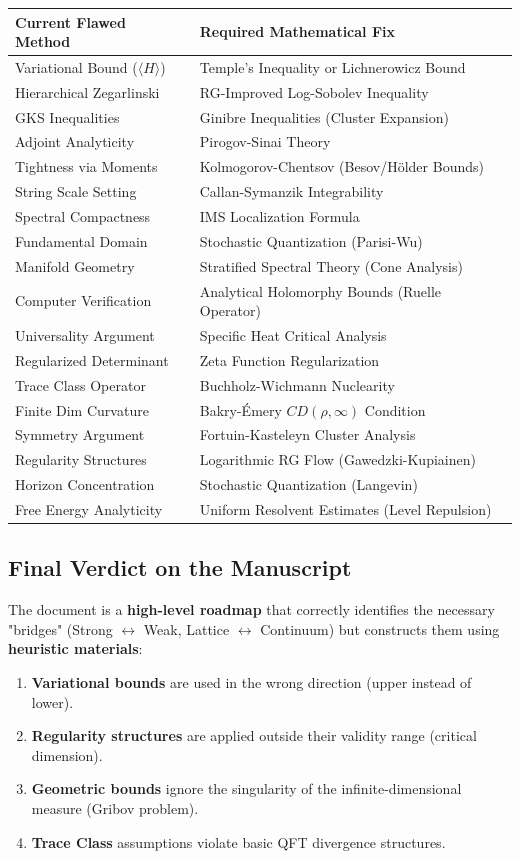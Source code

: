 \begin{center}
\begin{tabular}{|l|l|}
\hline
\textbf{Current Flawed Method} & \textbf{Required Mathematical Fix} \\
\hline
Variational Bound ($\langle H \rangle$) & Temple's Inequality or Lichnerowicz Bound \\
Hierarchical Zegarlinski & RG-Improved Log-Sobolev Inequality \\
GKS Inequalities & Ginibre Inequalities (Cluster Expansion) \\
Adjoint Analyticity & Pirogov-Sinai Theory \\
Tightness via Moments & Kolmogorov-Chentsov (Besov/Hölder Bounds) \\
String Scale Setting & Callan-Symanzik Integrability \\
Spectral Compactness & IMS Localization Formula \\
Fundamental Domain & Stochastic Quantization (Parisi-Wu) \\
Manifold Geometry & Stratified Spectral Theory (Cone Analysis) \\
Computer Verification & Analytical Holomorphy Bounds (Ruelle Operator) \\
Universality Argument & Specific Heat Critical Analysis \\
Regularized Determinant & Zeta Function Regularization \\
Trace Class Operator & Buchholz-Wichmann Nuclearity \\
Finite Dim Curvature & Bakry-Émery $CD(\rho, \infty)$ Condition \\
Symmetry Argument & Fortuin-Kasteleyn Cluster Analysis \\
Regularity Structures & Logarithmic RG Flow (Gawedzki-Kupiainen) \\
Horizon Concentration & Stochastic Quantization (Langevin) \\
Free Energy Analyticity & Uniform Resolvent Estimates (Level Repulsion) \\
\hline
\end{tabular}
\end{center}

\subsection{Final Verdict on the Manuscript}
The document is a \textbf{high-level roadmap} that correctly identifies the necessary "bridges" (Strong $\leftrightarrow$ Weak, Lattice $\leftrightarrow$ Continuum) but constructs them using \textbf{heuristic materials}:
\begin{enumerate}
    \item \textbf{Variational bounds} are used in the wrong direction (upper instead of lower).
    \item \textbf{Regularity structures} are applied outside their validity range (critical dimension).
    \item \textbf{Geometric bounds} ignore the singularity of the infinite-dimensional measure (Gribov problem).
    \item \textbf{Trace Class} assumptions violate basic QFT divergence structures.
\end{enumerate}

